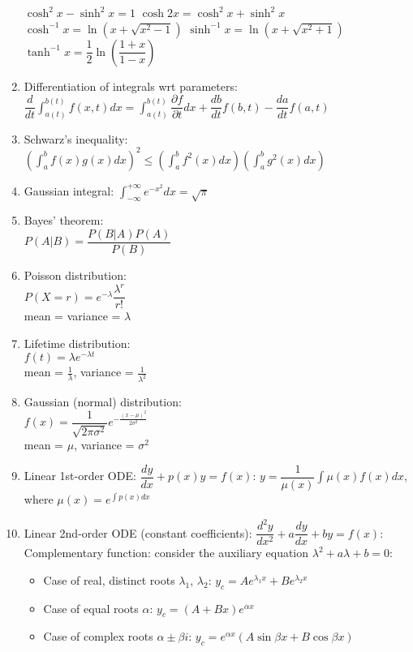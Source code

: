 \documentclass[fleqn]{article}
\begin{document}
\begin{enumerate}
		$\cosh^2 x-\sinh^2 x=1$\smallbreak
		$\cosh2x=\cosh^2 x+\sinh^2 x$\smallbreak
		$\cosh^{-1}x=\ln(x+\sqrt{x^2-1})$\smallbreak
		$\sinh^{-1}x=\ln(x+\sqrt{x^2+1})$\smallbreak
		$\tanh^{-1}x=\dfrac{1}{2}\ln\left(\dfrac{1+x}{1-x}\right)$
	\item Differentiation of integrals wrt parameters:\smallbreak
		$\dfrac{d}{dt}\displaystyle\int_{a(t)}^{b(t)}f(x,t)dx=\displaystyle\int_{a(t)}^{b(t)}\dfrac{\partial f}{\partial t}dx+\dfrac{db}{dt}f(b,t)-\dfrac{da}{dt}f(a,t)$
	\item Schwarz's inequality:\smallbreak
		$\left(\displaystyle\int_a^b f(x)g(x)dx\right)^2\leq\left(\displaystyle\int_a^b f^2(x)dx\right)\left(\displaystyle\int_a^b g^2(x)dx\right)$
	\item Gaussian integral:\smallbreak
		$\displaystyle\int_{-\infty}^{+\infty}e^{-x^2}dx=\sqrt{\pi}$
	\item Bayes' theorem:\\
		$P(A|B)=\dfrac{P(B|A)P(A)}{P(B)}$
	\item Poisson distribution:\\
		$P(X=r)=e^{-\lambda}\dfrac{\lambda^r}{r!}$\\
		mean = variance = $\lambda$
	\item Lifetime distribution:\\
		$f(t)=\lambda e^{-\lambda t}$\\
		mean = $\frac{1}{\lambda}$, variance = $\frac{1}{\lambda^2}$\\
	\item Gaussian (normal) distribution:\\
		$f(x)=\dfrac{1}{\sqrt{2\pi\sigma^2}}e^{-\frac{(x-\mu)^2}{2\sigma^2}}$\\
		mean = $\mu$, variance = $\sigma^2$
	\item Linear 1st-order ODE:\smallbreak
		$\dfrac{dy}{dx}+p(x)y=f(x)$:\smallbreak
		$y=\dfrac{1}{\mu(x)}\displaystyle\int\mu(x)f(x)dx$, where $\mu(x)=e^{\int p(x)dx}$
	\item Linear 2nd-order ODE (constant coefficients):\smallbreak
		$\dfrac{d^2y}{dx^2}+a\dfrac{dy}{dx}+by=f(x)$:\smallbreak
		Complementary function: consider the auxiliary equation $\lambda^2+a\lambda+b=0$:
		\begin{itemize}[label={--}, noitemsep, topsep=0pt]
			\item Case of real, distinct roots $\lambda_1$, $\lambda_2$: $y_c=Ae^{\lambda_1x}+Be^{\lambda_2x}$
			\item Case of equal roots $\alpha$: $y_c=(A+Bx)e^{\alpha x}$
			\item Case of complex roots $\alpha\pm\beta i$: $y_c=e^{\alpha x}(A\sin\beta x+B\cos\beta x)$

\end{itemize}
\end{enumerate}
\end{document}

